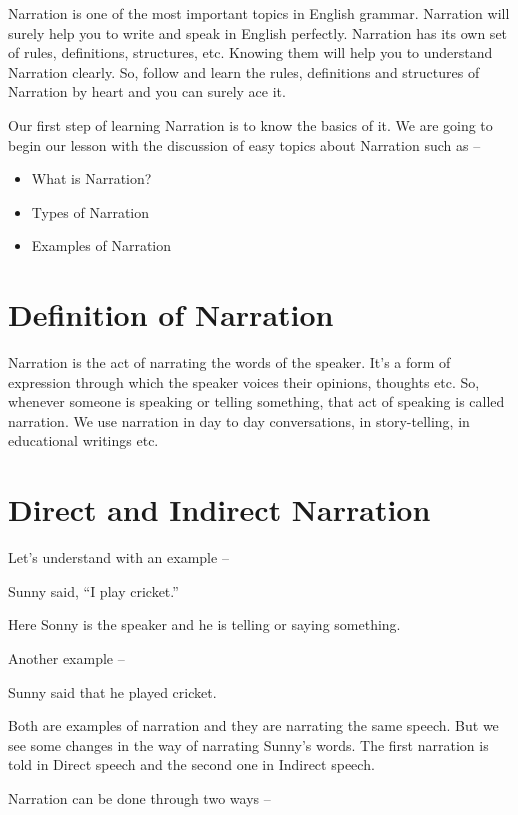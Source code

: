 \documentclass[a4paper,12pt]{book}
\begin{document}
Narration is one of the most important topics in English grammar. Narration will surely help you to write and speak in English perfectly. Narration has its own set of rules, definitions, structures, etc. Knowing them will help you to understand Narration clearly. So, follow and learn the rules, definitions and structures of Narration by heart and you can surely ace it. 

Our first step of learning Narration is to know the basics of it. We are going to begin our lesson with the discussion of easy topics about Narration such as –

\begin{itemize}
\item What is Narration?
\item Types of Narration
\item Examples of Narration
\end{itemize}

\section{Definition of Narration}
\label{sec:orge334a5a}

Narration is the act of narrating the words of the speaker. It’s a form of expression through which the speaker voices their opinions, thoughts etc. So, whenever someone is speaking or telling something, that act of speaking is called narration. We use narration in day to day conversations, in story-telling, in educational writings etc. 

\section{Direct and Indirect Narration}
\label{sec:org1f4511a}

Let’s understand with an example –

Sunny said, “I play cricket.”

Here Sonny is the speaker and he is telling or saying something. 

Another example – 

Sunny said that he played cricket.

Both are examples of narration and they are narrating the same speech. But we see some changes in the way of narrating Sunny’s words. The first narration is told in Direct speech and the second one in Indirect speech. 

Narration can be done through two ways – 
\end{document}
